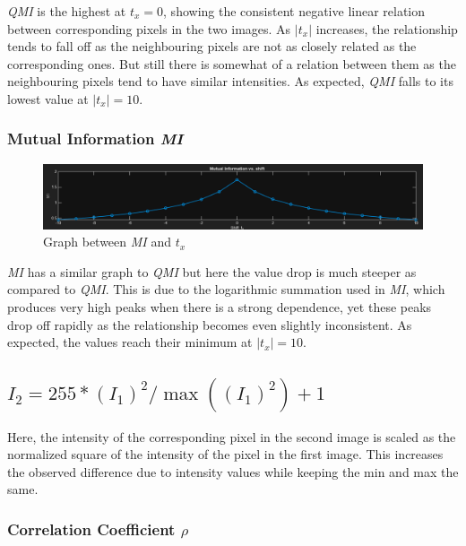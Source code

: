 \documentclass{report}
\begin{document}
\textit{QMI} is the highest at $t_x = 0$, showing the consistent negative linear relation between corresponding pixels in the two images. As $|t_x|$ increases, the relationship tends to fall off as the neighbouring pixels are not as closely related as the corresponding ones. But still there is somewhat of a relation between them as the neighbouring pixels tend to have similar intensities. As expected, \textit{QMI} falls to its lowest value at $|t_x| = 10$.

\vspace{1em}

\subsubsection*{Mutual Information \textit{MI}}

\begin{figure}[h]
    \centering
    \includegraphics[width=\textwidth]{q4_1_mi.png}
    \caption{Graph between \textit{MI} and $t_x$}
\end{figure}

\textit{MI} has a similar graph to \textit{QMI} but here the value drop is much steeper as compared to \textit{QMI}. This is due to the logarithmic summation used in \textit{MI}, which produces very high peaks when there is a strong dependence, yet these peaks drop off rapidly as the relationship becomes even slightly inconsistent. As expected, the values reach their minimum at $|t_x| = 10$.

\newpage

\subsection*{\boldmath$I_2 = 255 * (I_1)^2 / \max((I_1)^2) + 1$}

Here, the intensity of the corresponding pixel in the second image is scaled as the normalized square of the intensity of the pixel in the first image. This increases the observed difference due to intensity values while keeping the min and max the same.

\subsubsection*{Correlation Coefficient \boldmath$\rho$}
\end{document}
